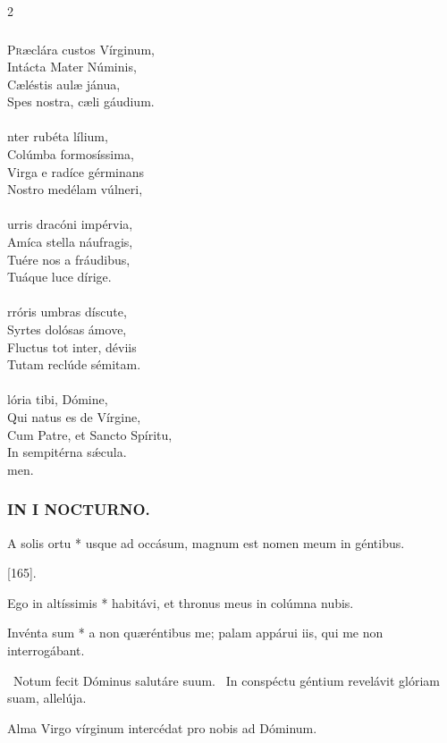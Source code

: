 \documentclass[9pt,twoside]{extarticle}
\begin{document}
\begin{multicols}{2}
\subsubsection*{\center {}}
\lettrine{P}ræclára custos Vírginum,\\
Intácta Mater Núminis,\\
Cæléstis aulæ jánua,\\
Spes nostra, cæli gáudium.\\
\\
nter rubéta lílium,\\
Colúmba formosíssima,\\
Virga e radíce gérminans\\
Nostro medélam vúlneri,\\
\\
urris dracóni impérvia,\\
Amíca stella náufragis,\\
Tuére nos a fráudibus,\\
Tuáque luce dírige.\\
\\
rróris umbras díscute,\\
Syrtes dolósas ámove,\\
Fluctus tot inter, déviis\\
Tutam reclúde sémitam.\\
\\
lória tibi, Dómine,\\
Qui natus es de Vírgine,\\
Cum Patre, et Sancto Spíritu,\\
In sempitérna sǽcula.\\
men.

\subsubsection*{\center \textsc{IN I NOCTURNO.}}
\begin{tightlist}{}
\item {} A solis ortu * usque ad occásum, magnum est nomen meum in géntibus.
\item {\small {} [165].}
\item {} Ego in altíssimis * habitávi, et thronus meus in colúmna nubis.
\item {} Invénta sum * a non quæréntibus me; palam appárui iis, qui me non interrogábant.
\item {}~Notum fecit Dóminus salutáre suum. ~In conspéctu géntium revelávit glóriam suam, allelúja.
\item {\small {} Alma Virgo vírginum intercédat pro nobis ad Dóminum.}
\end{tightlist}


\end{multicols}
\end{document}
